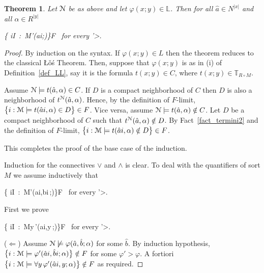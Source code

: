 \documentclass[12pt,letterpaper,oneside,reqno]{amsart}
\theoremstyle{plain}
\newtheorem{theorem}{Theorem}%
\theoremstyle{remark}
\begin{document}
\begin{theorem}\label{thm_Los}
  Let ${\EuScript N}$ be as above and let $\varphi(x;y)\in\mathds{L}$.
  Then for all $\hat a\in N^{|x|}$ and all $\alpha\in R^{|y|}$

  {\Leftrightarrow}
  {\big\{ i\in I\ :\ {\EuScript M}\models\varphi'(\hat ai;\alpha)\big\}\in F \ \textrm{for every }\varphi'>\varphi.}

\end{theorem}
\begin{proof}
  By induction on the syntax.
  If $\varphi(x;y)\in L$ then the theorem reduces to the classical \L\v{o}\'s Theorem. Then, suppose that $\varphi(x;y)$ is as in (i) of Definition~\ref{def_LL}, say it is the formula $t(x;y)\in C$, where $t(x;y)\in \mathds{T}_{R\circ M}$.
  
  Assume ${\EuScript N}\models t(\hat a,\alpha)\in C$.
  If $D$ is a compact neighborhood of $C$ then $D$ is also a neighborhood of $t^{\EuScript N}(\hat a,\alpha)$.
  Hence, by the definition of $F$-limit, $\big\{ i:{\EuScript M}\models t(\hat ai,\alpha)\in D\big\}\in F$.
  Vice versa, assume ${\EuScript N}\models t(\hat a,\alpha)\notin C$.
  Let $D$ be a compact neighborhood of $C$ such that $t^{\EuScript N}(\hat a,\alpha)\notin D$. 
  By Fact~\ref{fact_termini2} and the definition of $F$-limit, $\big\{ i:{\EuScript M}\models t(\hat ai,\alpha)\notin D\big\}\in F$.

  This completes the proof of the base case of the induction.

  Induction for the connectives $\vee$ and $\wedge$ is clear.
  To deal with the quantifiers of sort $M$ we assume inductively that 

  {\Leftrightarrow}
  {\big\{ i\in I\ :\ {\EuScript M}\models\varphi'(\hat ai,\hat bi\,;\alpha)\big\}\in F \ \textrm{for every }\varphi'>\varphi.}
  
  First we prove

  {\Leftrightarrow}
  {\big\{ i\in I\ :\ {\EuScript M}\models\forall y\,\varphi'(\hat ai,y\,;\alpha)\big\}\in F \ \textrm{for every }\varphi'>\varphi.}


  ($\Leftarrow$) Assume ${\EuScript N}\not\models\varphi(\hat a,\hat b; \alpha)$ for some $\hat b$.
  By induction hypothesis, $\big\{ i: {\EuScript M}\models\varphi'(\hat ai,\hat bi;\alpha)\big\}\notin F$ for some $\varphi'>\varphi$.
  A fortiori $\big\{ i:{\EuScript M}\models\forall y\,\varphi'(\hat ai,y;\alpha)\big\}\notin F$ as required.


\end{proof}
\end{document}
